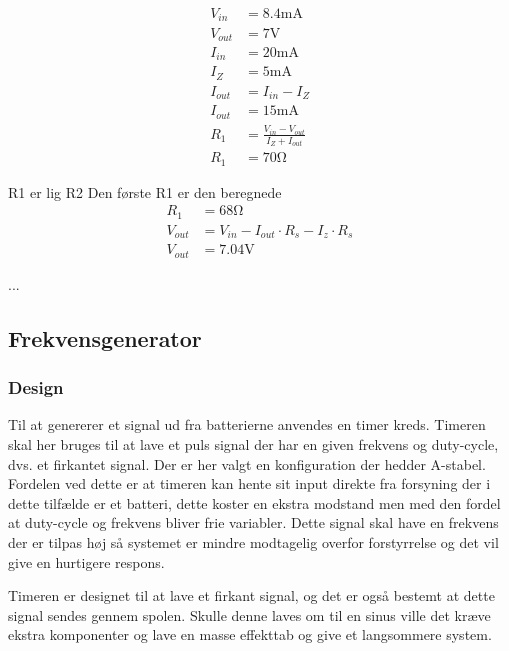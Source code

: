 	
	\begin{align}
	V_{in} & = 8.4 \si{\milli\ampere} \nonumber \\
	V_{out} & = 7 \si{\volt} \nonumber \\
	I_{in} & = 20\si{\milli\ampere} \nonumber \\
	I_Z & = 5 \si{\milli\ampere} \nonumber \\
	I_{out} & = I_{in} - I_Z \\
	I_{out} & = 15 \si{\milli\ampere} \nonumber \\
	R_1 & = \frac{V_{in} - V_{out}}{I_Z + I_{out}} \label{eq:RegulatorModstand} \\
	R_1 & = 70 \si{\ohm} \nonumber \label{eq:RegulatorModstandBeregnet}
	\end{align}
	
	R1 er lig R2
	Den første R1 er den beregnede
	\begin{align}
	R_1 & = 68 \si{\ohm} \nonumber \\
	V_{out} & = V_{in} - I_{out} \cdot R_s - I_z \cdot R_s \\
	V_{out} & = 7.04 \si{\volt} \label{eq:RegulatorBeregnetPotentiale} 
	\end{align}
	



...

\subsection{Frekvensgenerator}
\subsubsection{Design}
Til at genererer et signal ud fra batterierne anvendes en timer kreds. 
Timeren skal her bruges til at lave et puls signal der har en given frekvens og duty-cycle, dvs. et firkantet signal. 
Der er her valgt en konfiguration der hedder A-stabel. 
Fordelen ved dette er at timeren kan hente sit input direkte fra forsyning der i dette tilfælde er et batteri, dette koster en ekstra modstand men med den fordel at duty-cycle og frekvens bliver frie variabler. 
Dette signal skal have en frekvens der er tilpas høj så systemet er mindre modtagelig overfor forstyrrelse og det vil give en hurtigere respons. 

Timeren er designet til at lave et firkant signal, og det er også bestemt at dette signal sendes gennem spolen.
Skulle denne laves om til en sinus ville det kræve ekstra komponenter og lave en masse effekttab og give et langsommere system.

